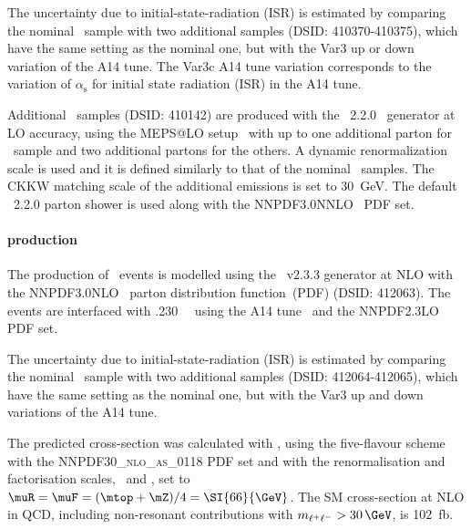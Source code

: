 The uncertainty due to initial-state-radiation (ISR) is estimated by
comparing the nominal \ttV\ sample with two additional samples (DSID\@: 410370-410375), which
have the same setting as the nominal one, but with the Var3 up or down
variation of the A14 tune.  The Var3c A14 tune variation corresponds
to the variation of $\alpha_{\textrm{s}}$ for initial state radiation
(ISR) in the A14 tune.

Additional \ttV\ samples (DSID\@: 410142) are produced with the
\sherpa~2.2.0~\cite{Bothmann:2019yzt} generator at LO accuracy, using
the MEPS@LO setup~\cite{Catani:2001cc,Hoeche:2009rj} with up to one
additional parton for \ttll\ sample and two additional partons for the
others. A dynamic renormalization scale is used and it is defined
similarly to that of the nominal \ttV\ samples. The CKKW matching
scale of the additional emissions is set to 30~GeV. The default
\sherpa~2.2.0 parton shower is used along with the
NNPDF3.0NNLO~\cite{Ball:2014uwa} PDF set.

\paragraph{\tZq production}
The production of \tZq\ events is modelled using the \mgamc~v2.3.3 \cite{Alwall:2014hca}
generator at NLO with the NNPDF3.0NLO~\cite{Ball:2014uwa} parton distribution function~(PDF) (DSID\@: 412063).
The events are interfaced with \pythia.230~\cite{Sjostrand:2014zea}~ using the A14 tune~\cite{ATL-PHYS-PUB-2014-021} and the NNPDF2.3LO~\cite{Ball:2014uwa} PDF set.

The uncertainty due to initial-state-radiation (ISR) is estimated by comparing the nominal \tZq\ sample with two additional samples (DSID\@: 412064-412065),
which have the same setting as the nominal one, but with the Var3 up and down variations of the A14 tune. 

The predicted cross-section was calculated with , using the five-flavour scheme with the \textsc{NNPDF30\_nlo\_as\_0118} PDF set and with the renormalisation and factorisation scales, \muR\ and \muF, set to $\muR = \muF = (\mtop + \mZ)/4 = \SI{66}{\GeV}$. The SM \tZq cross-section at NLO in QCD, including non-resonant contributions with $m_{\ell^+\ell^-} > 30\,\GeV$, is \SI{102}{fb}.


